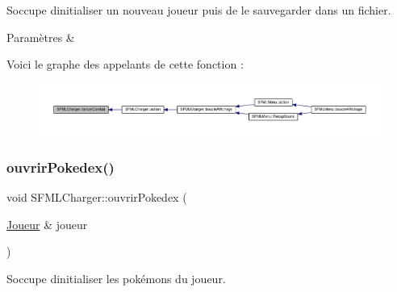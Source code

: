 S\textquotesingle{}occupe d\textquotesingle{}initialiser un nouveau joueur puis de le sauvegarder dans un fichier. 


\begin{DoxyParams}{Paramètres}
{\em } & \\
\hline
\end{DoxyParams}
Voici le graphe des appelants de cette fonction \+:\nopagebreak
\begin{figure}[H]
\begin{center}
\leavevmode
\includegraphics[width=350pt]{class_s_f_m_l_charger_a988a052585ee0fe9e61535d5027a6f81_icgraph}
\end{center}
\end{figure}
\mbox{\label{class_s_f_m_l_charger_a67c610529df46560908104f963d741f1}} 
\subsubsection{\texorpdfstring{ouvrir\+Pokedex()}{ouvrirPokedex()}}
{\footnotesize\ttfamily void S\+F\+M\+L\+Charger\+::ouvrir\+Pokedex (\begin{DoxyParamCaption}\item[{\hyperlink{class_joueur}{Joueur} \&}]{joueur }\end{DoxyParamCaption})\hspace{0.3cm}{\ttfamily [private]}}



S\textquotesingle{}occupe d\textquotesingle{}initialiser les pokémons du joueur. 


